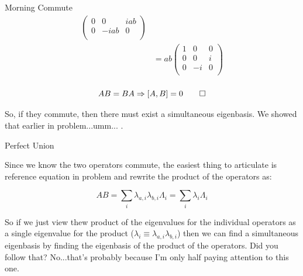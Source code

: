 \begin{answer}
\begin{answerpart}{Morning Commute}
\begin{equation}
\begin{split}
\begin{pmatrix}
          0 & 0 & iab\\
          0 & -iab & 0\\
        \end{pmatrix}
        \\
        &= ab\begin{pmatrix}
          1 & 0 & 0\\
          0 & 0 & i\\
          0 & -i & 0\\
        \end{pmatrix}
        \\
      \end{split}
    \end{equation}

    \begin{equation}
      AB = BA \Rightarrow [A, B] = 0\qed
    \end{equation}

    So, if they commute, then there must exist a simultaneous
    eigenbasis.  We showed that earlier in
    problem...umm... .
  \end{answerpart}

  \begin{answerpart}{Perfect Union}

    Since we know the two operators commute, the easiest thing to
    articulate is reference equation  in problem
     and rewrite the product of the
    operators as:

    \begin{equation}
      AB
      = \sum_i \lambda_{a,i}\lambda_{b,i}\Lambda_i
      = \sum_i \lambda_i\Lambda_i
    \end{equation}

    So if we just view thew product of the eigenvalues for the
    individual operators as a single eigenvalue for the product
    ($\lambda_i \equiv \lambda_{a,i}\lambda_{b,i}$) then we can find a
    simultaneous eigenbasis by finding the eigenbasis of the product
    of the operators.  Did you follow that?  No...that's probably
    because I'm only half paying attention to this one.


\end{answerpart}
\end{answer}
